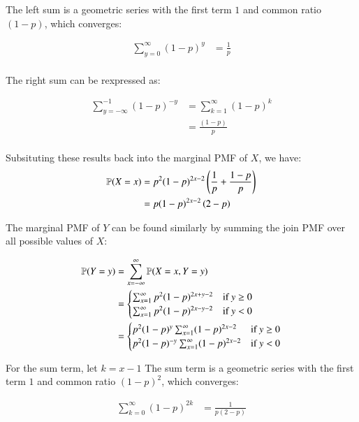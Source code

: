 \documentclass[12pt]{article}
\begin{document}
\begin{enumerate}
\begin{enumerate}
The left sum is a geometric series with the first term $1$ and common ratio $(1-p)$, which converges:

\begin{align*}
\sum_{y=0}^{\infty} (1-p)^{y} &= \frac{1}{p} \\
\end{align*}

The right sum can be rexpressed as:

\begin{align*}
\sum_{y=-\infty}^{-1} (1-p)^{-y} &= \sum_{k=1}^{\infty} (1-p)^{k} \\
&= \frac{(1-p)}{p} \\
\end{align*}

Subsituting these results back into the marginal PMF of $X$, we have:
\begin{align*}
{\mathbb P}(X=x) &= p^2(1-p)^{2x-2} \left(\frac{1}{p} + \frac{1-p}{p}\right) \\
&= p(1-p)^{2x-2} \left( 2-p \right) \\
\end{align*}

The marginal PMF of $Y$ can be found similarly by summing the join PMF over all possible values of $X$:

\begin{align*}
{\mathbb P}(Y=y) &= \sum_{x=-\infty}^{\infty} {\mathbb P}(X=x, Y=y) \\
&= \begin{cases}
\sum_{x=1}^{\infty} p^2(1-p)^{2x+y-2} & \text{if } y \geq 0 \\
\sum_{x=1}^{\infty} p^2(1-p)^{2x-y-2} & \text{if } y < 0
\end{cases}	\\
&= \begin{cases}
	p^2(1-p)^{y} \sum_{x=1}^{\infty} (1-p)^{2x-2} & \text{if } y \geq 0 \\
	p^2(1-p)^{-y} \sum_{x=1}^{\infty} (1-p)^{2x-2} & \text{if } y < 0
\end{cases} \\
\end{align*}

For the sum term, let $k=x-1$ The sum term is a geometric series with the first term $1$ and common ratio $(1-p)^2$, which converges:

\begin{align*}
\sum_{k=0}^{\infty} (1-p)^{2k} &= \frac{1}{p(2-p)} \\
\end{align*}


\end{enumerate}
\end{enumerate}
\end{document}
